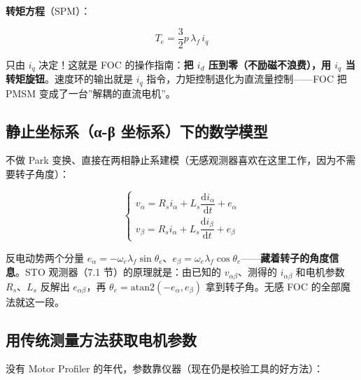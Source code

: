 \documentclass[
  UTF8,
  scheme=plain,
  fontsize=10pt,
  openany
]{ctexbook}
\begin{document}
\textbf{转矩方程}（SPM）：

\[T_e = \frac{3}{2} p \, \lambda_f \, i_q\]

只由 \(i_q\) 决定！这就是 FOC 的操作指南：\textbf{把 \(i_d\)
压到零（不励磁不浪费），用 \(i_q\) 当转矩旋钮}。速度环的输出就是 \(i_q\)
指令，力矩控制退化为直流量控制------FOC 把 PMSM
变成了一台''解耦的直流电机''。

\subsection{静止坐标系（α-β
坐标系）下的数学模型}\label{ux9759ux6b62ux5750ux6807ux7cfbux3b1-ux3b2-ux5750ux6807ux7cfbux4e0bux7684ux6570ux5b66ux6a21ux578b}

不做 Park
变换、直接在两相静止系建模（无感观测器喜欢在这里工作，因为不需要转子角度）：

\[\begin{cases} v_\alpha = R_s i_\alpha + L_s \dfrac{\mathrm{d}i_\alpha}{\mathrm{d}t} + e_\alpha \\[4pt] v_\beta = R_s i_\alpha + L_s \dfrac{\mathrm{d}i_\beta}{\mathrm{d}t} + e_\beta \end{cases}\]

反电动势两个分量
\(e_\alpha = -\omega_e \lambda_f \sin\theta_e\)、\(e_\beta = \omega_e \lambda_f \cos\theta_e\)------\textbf{藏着转子的角度信息}。STO
观测器（7.1 节）的原理就是：由已知的 \(v_{\alpha\beta}\)、测得的
\(i_{\alpha\beta}\) 和电机参数 \(R_s\)、\(L_s\) 反解出
\(e_{\alpha\beta}\)，再
\(\theta_e = \mathrm{atan2}(-e_\alpha, e_\beta)\) 拿到转子角。无感 FOC
的全部魔法就这一段。

\subsection{用传统测量方法获取电机参数}\label{ux7528ux4f20ux7edfux6d4bux91cfux65b9ux6cd5ux83b7ux53d6ux7535ux673aux53c2ux6570}

没有 Motor Profiler 的年代，参数靠仪器（现在仍是校验工具的好方法）：
\end{document}
